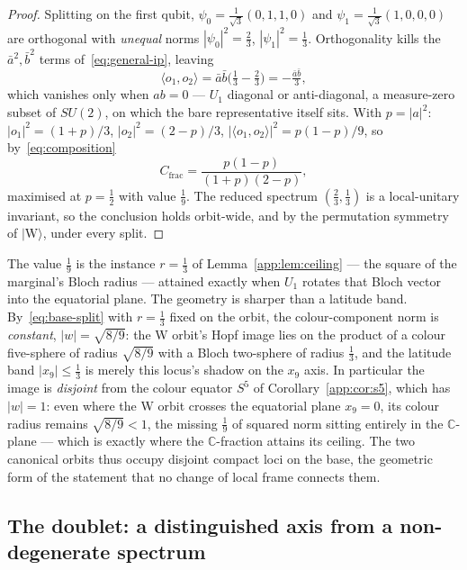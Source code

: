 \begin{proof}
Splitting on the first qubit, $\psi_0 = \tfrac1{\sqrt3}(0,1,1,0)$ and
$\psi_1 = \tfrac1{\sqrt3}(1,0,0,0)$ are orthogonal with \emph{unequal} norms
$|\psi_0|^2 = \tfrac23$, $|\psi_1|^2 = \tfrac13$. Orthogonality kills the $\bar a^2,\bar b^2$ terms
of~\eqref{eq:general-ip}, leaving
\begin{equation}
  \langle o_1,o_2\rangle = \bar a\bar b\bigl(\tfrac13-\tfrac23\bigr) = -\tfrac{\bar a\bar b}{3},
\end{equation}
which vanishes only when $ab = 0$ --- $U_1$ diagonal or anti-diagonal, a measure-zero subset of
$SU(2)$, on which the bare representative itself sits. With $p = |a|^2$:
$|o_1|^2 = (1+p)/3$, $|o_2|^2 = (2-p)/3$, $|\langle o_1,o_2\rangle|^2 = p(1-p)/9$, so
by~\eqref{eq:composition}
\begin{equation}
  C_{\mathrm{frac}} = \frac{p(1-p)}{(1+p)(2-p)},
  \label{eq:wcfrac}
\end{equation}
maximised at $p = \tfrac12$ with value $\tfrac19$. The reduced spectrum $(\tfrac23,\tfrac13)$ is a
local-unitary invariant, so the conclusion holds orbit-wide, and by the permutation symmetry of
$\lvert\mathrm{W}\rangle$, under every split.
\end{proof}

The value $\tfrac19$ is the instance $r = \tfrac13$ of Lemma~\ref{app:lem:ceiling} --- the square of
the marginal's Bloch radius --- attained exactly when $U_1$ rotates that Bloch vector into the
equatorial plane. The geometry is sharper than a latitude band. By~\eqref{eq:base-split} with
$r = \tfrac13$ fixed on the orbit, the colour-component norm is \emph{constant},
$|w| = \sqrt{8/9}$: the W orbit's Hopf image lies on the product of a colour five-sphere of radius
$\sqrt{8/9}$ with a Bloch two-sphere of radius $\tfrac13$, and the latitude band
$|x_9|\le\tfrac13$ is merely this locus's shadow on the $x_9$ axis. In particular the image is
\emph{disjoint} from the colour equator $S^5$ of Corollary~\ref{app:cor:s5}, which has $|w| = 1$:
even where the W orbit crosses the equatorial plane $x_9 = 0$, its colour radius remains
$\sqrt{8/9} < 1$, the missing $\tfrac19$ of squared norm sitting entirely in the $\mathbb{C}$-plane
--- which is exactly where the $\mathbb{C}$-fraction attains its ceiling. The two canonical orbits
thus occupy disjoint compact loci on the base, the geometric form of the statement that no change of
local frame connects them.

\subsection{The doublet: a distinguished axis from a non-degenerate spectrum}

